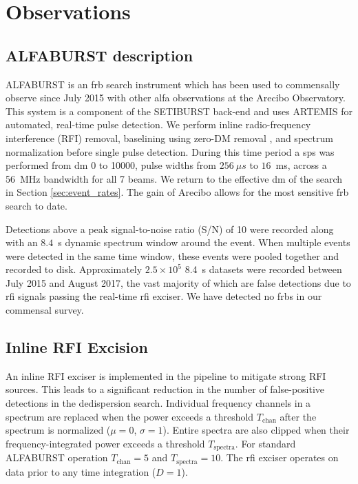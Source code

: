\documentclass[a4paper,fleqn,usenatbib]{mnras}
\begin{document}
\section{Observations}
\label{sec:overview}

\subsection{ALFABURST description}

ALFABURST is an \gls{frb} search instrument which has been used to commensally
observe since July 2015 with other \gls{alfa} observations at the Arecibo
Observatory. This system is a component of the SETIBURST back-end
\citep{2017ApJS..228...21C} and uses ARTEMIS \citep{2015MNRAS.452.1254K} for
automated, real-time pulse detection. We perform inline radio-frequency
interference (RFI) removal, baselining using zero-DM removal
\citep{2009MNRAS.395..410E}, and spectrum normalization before single pulse
detection. During this time period a \gls{sps} was performed from \gls{dm} 0 to
10000, pulse widths from $256~\mu s$ to $16$~ms, across a 56~MHz bandwidth for
all 7 beams. We return to the effective \gls{dm} of the search in Section
\ref{sec:event_rates}. The gain of Arecibo allows for the most sensitive
\gls{frb} search to date.

Detections above a peak signal-to-noise ratio (S/N) of 10 were recorded along
with an $8.4$~s dynamic spectrum window around the event. When multiple events
were detected in the same time window, these events were pooled together and
recorded to disk.  Approximately $2.5 \times 10^5$ 8.4~s datasets were recorded
between July 2015 and August 2017, the vast majority of which are false
detections due to \gls{rfi} signals passing the real-time \gls{rfi} exciser. We
have detected no \glspl{frb} in our commensal survey.


\subsection{Inline RFI Excision}
\label{sec:rfi_excise}

An inline RFI exciser is implemented in the pipeline to mitigate strong RFI
sources. This leads to a significant reduction in the number of false-positive
detections in the dedispersion search.  Individual frequency channels in a
spectrum are replaced when the power exceeds a threshold $T_{\textrm{chan}}$ after the
spectrum is normalized ($\mu=0$, $\sigma=1$). Entire spectra are also clipped
when their frequency-integrated power exceeds a threshold $T_{\textrm{spectra}}$. For standard
ALFABURST operation $T_{\textrm{chan}} = 5$ and $T_{\textrm{spectra}} = 10$.
The \gls{rfi} exciser operates on data prior to any time integration ($D=1$).
\end{document}
